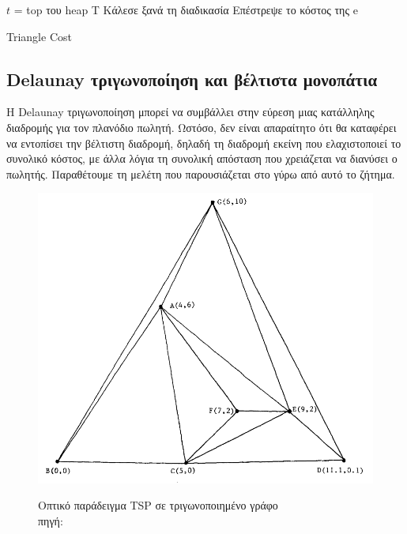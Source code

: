 \documentclass[oneside,12pt]{book}
\newenvironment{matlab}
	{\begin{figure}[hp]\centering\captionsetup{justification=centering}}
	{\end{figure}}
\theoremstyle{definition}
\begin{document}
\begin{algorithm}[H]
	\SetAlgoLined

	\(t\) = top του heap T \;
	{Κάλεσε ξανά τη διαδικασία \;}
	Επέστρεψε το κόστος της e \;

	\caption{Triangle Cost}
\end{algorithm}

\subsection{Delaunay τριγωνοποίηση και βέλτιστα μονοπάτια}

Η Delaunay τριγωνοποίηση μπορεί να συμβάλλει στην εύρεση μιας κατάλληλης διαδρομής για τον πλανόδιο πωλητή. Ωστόσο, δεν είναι απαραίτητο ότι θα καταφέρει να εντοπίσει την βέλτιστη διαδρομή, δηλαδή τη διαδρομή εκείνη που ελαχιστοποιεί το συνολικό κόστος, με άλλα λόγια τη συνολική απόσταση που χρειάζεται να διανύσει ο πωλητής. Παραθέτουμε τη μελέτη που παρουσιάζεται στο \cite{18} γύρω από αυτό το ζήτημα. \\

\begin{matlab}
	\includegraphics[scale=0.5]{images/delaunay.png}
	\caption{Οπτικό παράδειγμα TSP σε τριγωνοποιημένο γράφο \\ πηγή: \cite{18}}
\end{matlab}
\end{document}
